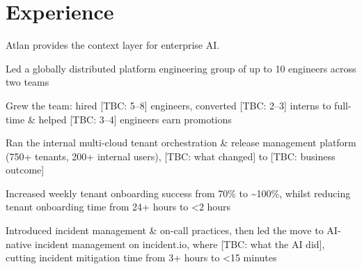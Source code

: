 \documentclass[]{AayushSarva}
\begin{document}
\hfill
\begin{minipage}[t]{0.66\textwidth} 




\section{Experience}

\hfill
{}
\vspace{0.1em}

Atlan provides the context layer for enterprise AI.

\vspace{0.1em}



\begin{tightemize}

\item Led a globally distributed platform engineering group of up to 10 engineers across two teams

\item Grew the team: hired [TBC: 5–8] engineers, converted [TBC: 2–3] interns to full-time \& helped [TBC: 3–4] engineers earn promotions

\item Ran the internal multi-cloud tenant orchestration \& release management platform (750+ tenants, 200+ internal users), [TBC: what changed] to [TBC: business outcome]

\item Increased weekly tenant onboarding success from 70\% to \textasciitilde100\%, whilst reducing tenant onboarding time from 24+ hours to <2 hours

\item Introduced incident management \& on-call practices, then led the move to AI-native incident management on incident.io, where [TBC: what the AI did], cutting incident mitigation time from 3+ hours to <15 minutes


\end{tightemize}
\end{minipage}
\end{document}

